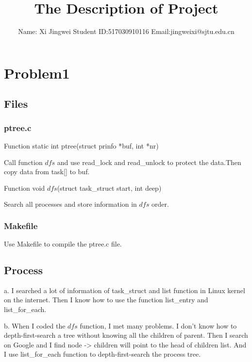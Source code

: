 \documentclass[a4paper,oneside,12pt]{article}
\title{\huge{The Description of Project}}
\author{Name: Xi Jingwei  \quad Student ID:517030910116 \quad   Email:jingweixi@sjtu.edu.cn}
\date{}  %
\begin{document}
\maketitle
\setlength{\oddsidemargin}{0.5cm}
\setlength{\evensidemargin}{\oddsidemargin}
\setlength{\textwidth}{15cm}
\vspace{-.8cm}


\setlength{\oddsidemargin}{-.5cm}  %
\setlength{\evensidemargin}{\oddsidemargin}
\setlength{\textwidth}{17.00cm}

\section{Problem1}
\subsection{Files}
\subsubsection{ptree.c}
Function static int ptree(struct prinfo *buf, int *nr)

Call function $dfs$ and use read\_lock and read\_unlock to protect the data.Then copy data from task[] to buf.

Function void $dfs$(struct task\_struct start, int deep)

Search all processes and store information in $dfs$ order.

\subsubsection{Makefile}

Use Makefile to compile the ptree.c file.

\subsection{Process}

a. I searched a lot of information of task\_struct and list function in Linux kernel on the internet. Then I know how to use the function list\_entry and list\_for\_each.

b. When I coded the $dfs$ function, I met many problems. I don't know how to depth-first-search a tree without knowing all the children of parent. Then I search on Google and I find node -> children will point to the head of children list. And I use list\_for\_each function to depth-first-search the process tree.
\end{document}
